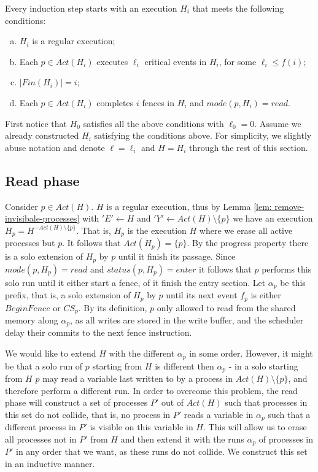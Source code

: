 Every induction step starts with an execution $H_i$ that meets the following conditions:

\begin{enumerate}[(a)]
	\item $H_i$ is a regular execution;
	\item Each $p \in Act(H_i)$ executes $\ell_i$ critical events in $H_i$, for some $\ell_i \leq f(i)$;
	\item $|Fin(H_i)| = i$;
	\item Each $p \in Act(H_i)$ completes $i$ fences in $H_i$ and $mode(p,H_i) = read$.
\end{enumerate}

First notice that $H_0$ satisfies all the above conditions with $\ell_0 = 0$. Assume we already constructed $H_i$ satisfying the conditions above. For simplicity, we slightly abuse notation and denote $\ell = \ell_i$ and $H = H_i$ through the rest of this section.





\newpage
\subsection{Read phase} \label{subsec:read-phase}

Consider $p \in Act(H)$. $H$ is a regular execution, thus by Lemma \ref{lem: remove-invisibale-processes} with $'E' \leftarrow H$ and $'Y' \leftarrow Act(H) \setminus \{p\}$ we have an execution $H_p = H^{-Act(H) \setminus \{p\}}$. That is, $H_p$ is the execution $H$ where we erase all active processes but $p$. It follows that $Act(H_p) = \{p\}$.
By the progress property there is a solo extension of $H_p$ by $p$ until it finish its passage. Since $mode(p,H_p) = read$ and $status(p,H_p) = enter$ it follows that $p$ performs this solo run until it either start a fence, of it finish the entry section. Let $\alpha_p$ be this prefix, that is, a solo extension of $H_p$ by $p$ until its next event $f_p$ is either $BeginFence$ or $CS_p$.
By its definition, $p$ only allowed to read from the shared memory along $\alpha_p$, as all writes are stored in the write buffer, and the scheduler delay their commits to the next fence instruction.

We would like to extend $H$ with the different $\alpha_p$ in some order. However, it might be that a solo run of $p$ starting from $H$ is different then $\alpha_p$ - in a solo starting from $H$ $p$ may read a variable last written to by a process in $Act(H) \setminus \{p\}$, and therefore perform a different run. In order to overcome this problem, the read phase will construct a set of processes $P'$ out of $Act(H)$ such that processes in this set do not collide, that is, no process in $P'$ reads a variable in $\alpha_p$ such that a different process in $P'$ is visible on this variable in $H$. This will allow us to erase all processes not in $P'$ from $H$ and then extend it with the runs $\alpha_p$ of processes in $P'$ in any order that we want, as these runs do not collide. We construct this set in an inductive manner.

